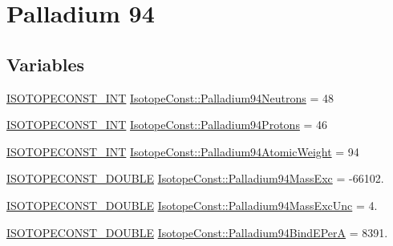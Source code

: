 \hypertarget{group___isotope_const-_palladium-_pd94}{}\section{Palladium 94}
\label{group___isotope_const-_palladium-_pd94}
\subsection*{Variables}
\begin{DoxyCompactItemize}
\item 
\mbox{\hyperlink{group___isotope_const-_macros_ga5f18360b3e99483a35c32d789e62621c}{I\+S\+O\+T\+O\+P\+E\+C\+O\+N\+S\+T\+\_\+\+I\+NT}} \mbox{\hyperlink{group___isotope_const-_palladium-_pd94_gad64b0b18247c2ef0ef6380474e3b52e8}{Isotope\+Const\+::\+Palladium94\+Neutrons}} = 48
\item 
\mbox{\hyperlink{group___isotope_const-_macros_ga5f18360b3e99483a35c32d789e62621c}{I\+S\+O\+T\+O\+P\+E\+C\+O\+N\+S\+T\+\_\+\+I\+NT}} \mbox{\hyperlink{group___isotope_const-_palladium-_pd94_ga6235490cace82a601170e56e99cf4127}{Isotope\+Const\+::\+Palladium94\+Protons}} = 46
\item 
\mbox{\hyperlink{group___isotope_const-_macros_ga5f18360b3e99483a35c32d789e62621c}{I\+S\+O\+T\+O\+P\+E\+C\+O\+N\+S\+T\+\_\+\+I\+NT}} \mbox{\hyperlink{group___isotope_const-_palladium-_pd94_gae69d5df8ea511c1e10a37c29296b011c}{Isotope\+Const\+::\+Palladium94\+Atomic\+Weight}} = 94
\item 
\mbox{\hyperlink{group___isotope_const-_macros_ga8f45a7272ce02c0b4c65c44636ed719a}{I\+S\+O\+T\+O\+P\+E\+C\+O\+N\+S\+T\+\_\+\+D\+O\+U\+B\+LE}} \mbox{\hyperlink{group___isotope_const-_palladium-_pd94_ga78327d9e8ba513a6b8216e937a1cd76b}{Isotope\+Const\+::\+Palladium94\+Mass\+Exc}} = -\/66102.
\item 
\mbox{\hyperlink{group___isotope_const-_macros_ga8f45a7272ce02c0b4c65c44636ed719a}{I\+S\+O\+T\+O\+P\+E\+C\+O\+N\+S\+T\+\_\+\+D\+O\+U\+B\+LE}} \mbox{\hyperlink{group___isotope_const-_palladium-_pd94_gae5faf7f9417d86abfa97e13ef36eaa4f}{Isotope\+Const\+::\+Palladium94\+Mass\+Exc\+Unc}} = 4.
\item 
\mbox{\hyperlink{group___isotope_const-_macros_ga8f45a7272ce02c0b4c65c44636ed719a}{I\+S\+O\+T\+O\+P\+E\+C\+O\+N\+S\+T\+\_\+\+D\+O\+U\+B\+LE}} \mbox{\hyperlink{group___isotope_const-_palladium-_pd94_ga1a38069147a5c946db8422934963a34e}{Isotope\+Const\+::\+Palladium94\+Bind\+E\+PerA}} = 8391.
\item 

\end{DoxyCompactItemize}
